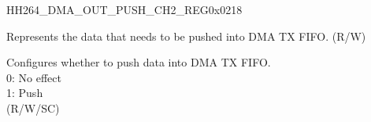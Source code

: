     \begin{register}{H}{H264\_DMA\_OUT\_PUSH\_CH2\_REG}{0x0218}\label{regdesc:H264DMAOUTPUSHCH2REG}
    \regnewline%
    \begin{regdesc}\begin{reglist}
    \label{fielddesc:H264DMAOUTFIFOWDATACH2}\item [H264\_DMA\_OUTFIFO\_WDATA\_CH2] Represents the data that needs to be pushed into DMA TX FIFO. (R/W)
    \label{fielddesc:H264DMAOUTFIFOPUSHCH2}\item [H264\_DMA\_OUTFIFO\_PUSH\_CH2] Configures whether to push data into DMA TX FIFO.\\
    0: No effect\\
    1: Push \\(R/W/SC)
    \end{reglist}\end{regdesc}
    \end{register}
